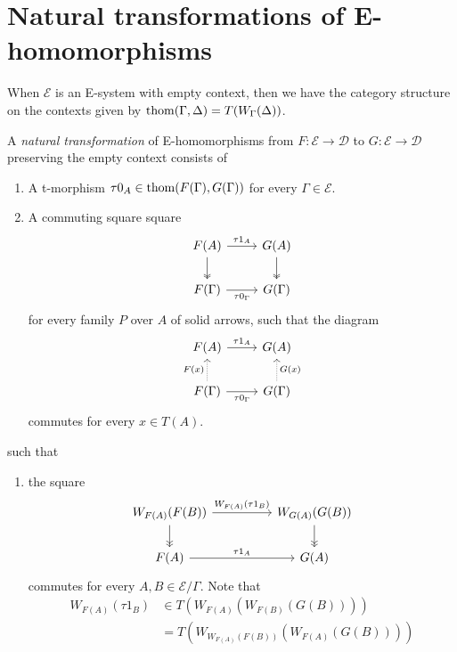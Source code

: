 \section{Natural transformations of E-homomorphisms}
\begin{rmk}
When $\mathcal{E}$ is an E-system with empty context, then we have the category
structure on the contexts given by $\mathrm{thom}(\Gamma,\Delta)= T(W_\Gamma(\Delta))$.
\end{rmk}

\begin{defn}
A \emph{natural transformation} of E-homomorphisms from $F:\mathcal{E}\to\mathcal{D}$
to $G:\mathcal{E}\to\mathcal{D}$ preserving the empty context consists of
\begin{enumerate}
\item A t-morphism $\tau0_A\in\mathrm{thom}(F(\Gamma),G(\Gamma))$ for every $\Gamma\in\mathcal{E}$.
\item A commuting square square
\begin{equation*}
\begin{tikzcd}
F(A) \arrow[r,"\tau1_A"] \arrow[d,twoheadrightarrow] & G(A) \arrow[d,twoheadrightarrow] \\
F(\Gamma) \arrow[r,swap,"\tau0_\Gamma"] & G(\Gamma)
\end{tikzcd}
\end{equation*}
for every family $P$ over $A$ of solid arrows, such that the diagram
\begin{equation*}
\begin{tikzcd}
F(A) \arrow[r,"\tau1_A"] & G(A) \\
F(\Gamma) \arrow[r,swap,"\tau0_\Gamma"] \arrow[densely dotted,u,"F(x)"] & G(\Gamma) \arrow[densely dotted,u,swap,"G(x)"]
\end{tikzcd}
\end{equation*}
commutes for every $x\in T(A)$.
\end{enumerate}
such that
\begin{enumerate}
\item the square
\begin{equation*}
\begin{tikzcd}[column sep=huge]
W_{F(A)}(F(B)) \arrow[r,"W_{F(A)}(\tau1_B)"] \arrow[d,->>] & W_{G(A)}(G(B)) \arrow[d,->>] \\
F(A) \arrow[r,"\tau1_A"] & G(A)
\end{tikzcd}
\end{equation*}
commutes for every $A,B\in\mathcal{E}/\Gamma$. Note that 
\begin{align*}
W_{F(A)}(\tau1_B)
  & \in 
T(W_{F(A)}(W_{F(B)}(G(B))))
  \\
  & =
T(W_{W_{F(A)}(F(B))}(W_{F(A)}(G(B))))
\end{align*}
\end{enumerate}
\end{defn}

